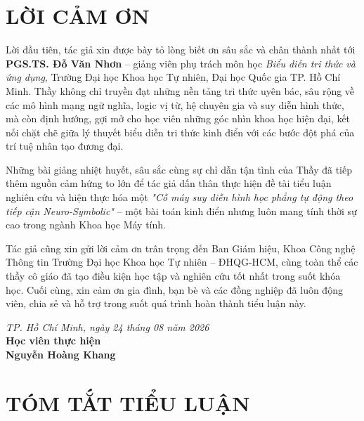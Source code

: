 
\chapter*{LỜI CẢM ƠN}

Lời đầu tiên, tác giả xin được bày tỏ lòng biết ơn sâu sắc và chân thành nhất tới \textbf{PGS.TS. Đỗ Văn Nhơn} -- giảng viên phụ trách môn học \textit{Biểu diễn tri thức và ứng dụng}, Trường Đại học Khoa học Tự nhiên, Đại học Quốc gia TP. Hồ Chí Minh. Thầy không chỉ truyền đạt những nền tảng tri thức uyên bác, sâu rộng về các mô hình mạng ngữ nghĩa, logic vị từ, hệ chuyên gia và suy diễn hình thức, mà còn định hướng, gợi mở cho học viên những góc nhìn khoa học hiện đại, kết nối chặt chẽ giữa lý thuyết biểu diễn tri thức kinh điển với các bước đột phá của trí tuệ nhân tạo đương đại.

Những bài giảng nhiệt huyết, sâu sắc cùng sự chỉ dẫn tận tình của Thầy đã tiếp thêm nguồn cảm hứng to lớn để tác giả dấn thân thực hiện đề tài tiểu luận nghiên cứu và hiện thực hóa một \textit{"Cỗ máy suy diễn hình học phẳng tự động theo tiếp cận Neuro-Symbolic"} -- một bài toán kinh điển nhưng luôn mang tính thời sự cao trong ngành Khoa học Máy tính.

Tác giả cũng xin gửi lời cảm ơn trân trọng đến Ban Giám hiệu, Khoa Công nghệ Thông tin Trường Đại học Khoa học Tự nhiên -- ĐHQG-HCM, cùng toàn thể các thầy cô giáo đã tạo điều kiện học tập và nghiên cứu tốt nhất trong suốt khóa học. Cuối cùng, xin cảm ơn gia đình, bạn bè và các đồng nghiệp đã luôn động viên, chia sẻ và hỗ trợ trong suốt quá trình hoàn thành tiểu luận này.

\begin{flushright}
    \textit{TP. Hồ Chí Minh, ngày 24 tháng 08 năm 2026}\\[0.1cm]
    \textbf{Học viên thực hiện}\\[0.6cm]
    \textbf{Nguyễn Hoàng Khang}
\end{flushright}

\newpage

\chapter*{TÓM TẮT TIỂU LUẬN}

